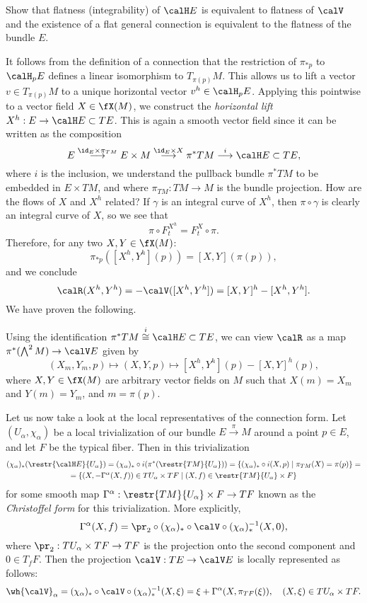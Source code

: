 \begin{xca}
    Show that flatness (integrability) of $\calH E$ is equivalent to flatness of $\calV$ and the existence of a flat general connection is equivalent to the flatness of the bundle $E$.
\end{xca}

It follows from the definition of a connection that the restriction of $\pi_{\ast p}$ to $\calH_pE$ defines a linear isomorphism to $T_{\pi(p)}M$.
This allows us to lift a vector $v\in T_{\pi(p)}M$ to a unique horizontal vector $v^h\in \calH_pE$. Applying this pointwise to a vector field $X\in\fX(M)$, we construct the \emph{horizontal lift} $X^h:E\to \calH E\subset TE$. This is again a smooth vector field since it can be written as the composition
\[E\overset{\id_E\times \pi_{TM}}{\longrightarrow}E\times M \overset{\id_E\times X}{\longrightarrow}\pi^\ast TM \overset{i}{\longrightarrow}\calH E\subset TE,\]
where $i$ is the inclusion, we understand the pullback bundle $\pi^\ast TM$ to be embedded in $E\times TM$, and where $\pi_{TM}:TM\to M$ is the bundle projection. How are the flows of $X$ and $X^h$ related? If $\gamma$ is an integral curve of $X^h$, then $\pi\circ\gamma$ is clearly an integral curve of $X$, so we see that 
\[\pi\circ F^{X^h}_t=F^{X}_t\circ \pi.\]
Therefore, for any two $X,Y\in \fX(M)$:
\[\pi_{\ast p}([X^h,Y^h](p))=[X,Y](\pi(p)),\]
and we conclude
\[\calR(X^h,Y^h)=-\calV([X^h,Y^h])=[X,Y]^h-[X^h,Y^h].\]
We have proven the following.

\begin{cor}\label{cor curvature in terms of hor}
    Using the identification $\pi^\ast TM\overset{i}{\cong}\calH E\subset TE$, we can view $\calR$ as a map $\pi^\ast(\bigwedge^2M)\to \calV E$ given by 
    \[(X_m,Y_m,p)\mapsto (X,Y,p)\mapsto [X^h,Y^h](p)-[X,Y]^h(p),\]
    where $X,Y\in \fX(M)$ are arbitrary vector fields on $M$ such that $X(m)=X_m$ and $Y(m)=Y_m$, and $m=\pi(p)$.
\end{cor}

Let us now take a look at the local representatives of the connection form. Let $(U_\alpha,\chi_\alpha)$ be a local trivialization of our bundle $E\overset{\pi}{\to}M$ around a point $p\in E$, and let $F$ be the typical fiber. Then in this trivialization
\begin{multline}
    (\chi_\alpha)_\ast(\restr{\calH E}{U_\alpha})=(\chi_\alpha)_\ast\circ i(\pi^\ast (\restr{TM}{U_\alpha}))=\{(\chi_\alpha)_\ast\circ i(X,p)\mid \pi_{TM}(X)=\pi(p)\}=\\
    =\{(X,-\Gamma^\alpha(X,f))\in TU_\alpha\times TF\mid (X,f)\in \restr{TM}{U_\alpha}\times F\}
\end{multline}
for some smooth map $\Gamma^\alpha:\restr{TM}{U_\alpha}\times F\to TF$ known as the \emph{Christoffel form} for this trivialization. More explicitly,
\[\Gamma^\alpha(X,f)=\pr_2\circ (\chi_\alpha)_\ast\circ \calV\circ (\chi_\alpha)_\ast^{-1}(X,0),\]
where $\pr_2:TU_\alpha\times TF\to TF$ is the projection onto the second component and $0 \in T_fF$. Then the projection $\calV:TE\to \calV E$ is locally represented as follows:
\[\wh{\calV}_\alpha=(\chi_\alpha)_\ast\circ \calV\circ (\chi_\alpha)_\ast^{-1}(X,\xi)=\xi+\Gamma^\alpha(X,\pi_{TF}(\xi)),\quad (X,\xi)\in TU_\alpha\times TF.\]


